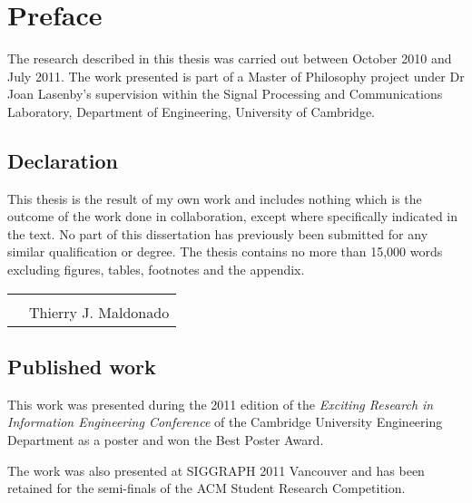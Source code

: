 
\chapter*{Preface}
The research described in this thesis was carried out between October 2010 and July 2011. The work presented is part of a Master of Philosophy project under Dr Joan Lasenby's supervision within the Signal Processing and Communications Laboratory, Department of Engineering, University of Cambridge. 

\section*{Declaration}
This thesis is the result of my own work and includes nothing which is the outcome of the work done in collaboration, except where specifically indicated in the text. No part of this dissertation has previously been submitted for any similar qualification or degree. The thesis contains no more than 15,000 words excluding figures, tables, footnotes and the appendix. 

\begin{center}
\begin{tabularx}{\textwidth}{ X c }
& \vspace*{1.5cm}\\
& Thierry J. Maldonado\\
\end{tabularx}
\end{center}

\section*{Published work}
This work was presented during the 2011 edition of the {\em Exciting Research in Information Engineering Conference} of the Cambridge University Engineering Department as a poster and won the Best Poster Award. 

The work was also presented at SIGGRAPH 2011 Vancouver \cite{maldonado2011simulation} and has been retained for the semi-finals of the ACM Student Research Competition.

\newpage
\thispagestyle{plain}

